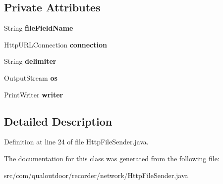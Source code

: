 \subsection*{Private Attributes}
\begin{DoxyCompactItemize}
\item 
\hypertarget{classcom_1_1qualoutdoor_1_1recorder_1_1network_1_1HttpFileSender_ac8d7432e0778e681b1c0c26fd56775c6}{String {\bfseries file\-Field\-Name}}\label{classcom_1_1qualoutdoor_1_1recorder_1_1network_1_1HttpFileSender_ac8d7432e0778e681b1c0c26fd56775c6}

\item 
\hypertarget{classcom_1_1qualoutdoor_1_1recorder_1_1network_1_1HttpFileSender_a6c0cfa28d820b8800f0260dcc275bb46}{Http\-U\-R\-L\-Connection {\bfseries connection}}\label{classcom_1_1qualoutdoor_1_1recorder_1_1network_1_1HttpFileSender_a6c0cfa28d820b8800f0260dcc275bb46}

\item 
\hypertarget{classcom_1_1qualoutdoor_1_1recorder_1_1network_1_1HttpFileSender_aaaaf6621f46d62188107533c876c1ddf}{String {\bfseries delimiter}}\label{classcom_1_1qualoutdoor_1_1recorder_1_1network_1_1HttpFileSender_aaaaf6621f46d62188107533c876c1ddf}

\item 
\hypertarget{classcom_1_1qualoutdoor_1_1recorder_1_1network_1_1HttpFileSender_aa1caa8ee3c6daeeb97077268a42fe34a}{Output\-Stream {\bfseries os}}\label{classcom_1_1qualoutdoor_1_1recorder_1_1network_1_1HttpFileSender_aa1caa8ee3c6daeeb97077268a42fe34a}

\item 
\hypertarget{classcom_1_1qualoutdoor_1_1recorder_1_1network_1_1HttpFileSender_a7f168c257595d95680c8d31f414d08cf}{Print\-Writer {\bfseries writer}}\label{classcom_1_1qualoutdoor_1_1recorder_1_1network_1_1HttpFileSender_a7f168c257595d95680c8d31f414d08cf}

\end{DoxyCompactItemize}


\subsection{Detailed Description}


Definition at line 24 of file Http\-File\-Sender.\-java.



The documentation for this class was generated from the following file\-:\begin{DoxyCompactItemize}
\item 
src/com/qualoutdoor/recorder/network/Http\-File\-Sender.\-java\end{DoxyCompactItemize}
